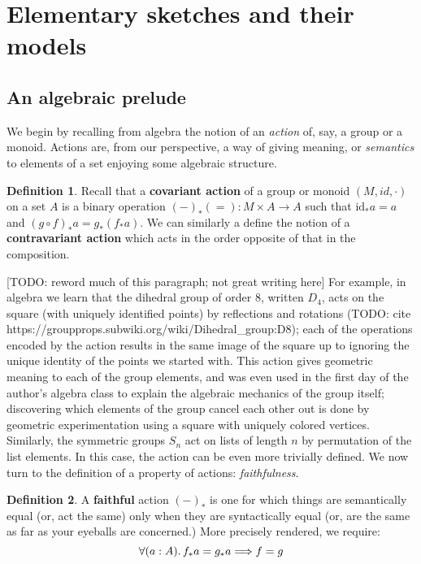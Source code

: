 \documentclass[12pt,twoside]{reedthesis}
\theoremstyle{definition}
\newtheorem{definition}{Definition}
\theoremstyle{remark}
\theoremstyle{theorem}
\begin{document}
\section{Elementary sketches and their models}
\subsection{An algebraic prelude}
We begin by recalling from algebra the notion of an \emph{action} of, say, a
group or a monoid. Actions are, from our perspective, a way of giving meaning,
or \emph{semantics} to elements of a set enjoying some algebraic structure.
\begin{definition}\label{def:covariant action}
  Recall that a \textbf{covariant action} of a group or monoid \((M, id, \cdot)\) on a
  set \(A\) is a binary operation \((-)_* (=) : M ‌\times A \rightarrow A\) such that
  \(\text{id}_* a = a\) and \( (g \circ f)_* a = g_* (f_* a) \). We can similarly a
  define the notion of a \textbf{contravariant action} which acts in the order
  opposite of that in the composition.
\end{definition}
[TODO: reword much of this paragraph; not great writing here]
For example, in algebra we learn that the dihedral group of order 8, written
$D_{4}$, acts on the square (with uniquely identified points) by reflections and
rotations (TODO: cite https://groupprops.subwiki.org/wiki/Dihedral\_group:D8);
each of the operations encoded by the action results in the same image of the
square up to ignoring the unique identity of the points we started with. This
action gives geometric meaning to each of the group elements, and was even used
in the first day of the author's algebra class to explain the algebraic
mechanics of the group itself; discovering which elements of the group cancel
each other out is done by geometric experimentation using a square with uniquely
colored vertices. Similarly, the symmetric groups $S_{n}$ act on lists of length
$n$ by permutation of the list elements. In this case, the action can be even
more trivially defined. We now turn to the definition of a property of actions:
\emph{faithfulness}.

\begin{definition}\label{def:faithful}
  A \textbf{faithful} action $(-)_{*}$ is one for which things
  are semantically equal (or, act the same) only when they are syntactically
  equal (or, are the same as far as your eyeballs are concerned.) More precisely
  rendered, we require: \[ \forall (a:A)\ldotp f_* a = g_* a \Longrightarrow f = g \]
\end{definition}
\end{document}
